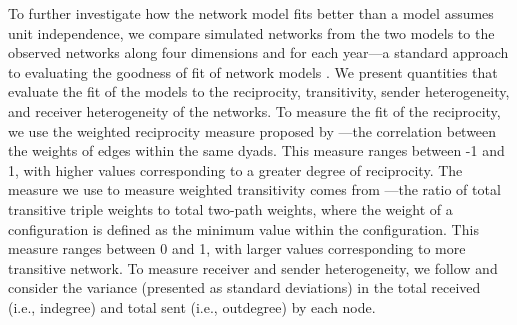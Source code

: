 \documentclass[reqno,onecolumn,letterpaper,12pt]{article}
\begin{document}
To further investigate how the network model fits better than a model assumes unit independence, we compare simulated networks from the two models to the observed networks along four dimensions and for each year---a standard approach to evaluating the goodness of fit of network models \citep{hunter2008goodness}. We present quantities that evaluate the fit of the models to the reciprocity, transitivity, sender heterogeneity, and receiver heterogeneity of the networks. To measure the fit of the reciprocity, we use the weighted reciprocity measure proposed by \cite{garlaschelli2004patterns}---the correlation between the weights of edges within the same dyads. This measure ranges between -1 and 1, with higher values corresponding to a greater degree of reciprocity.  The measure we use to measure weighted transitivity comes from \cite{opsahl2009clustering}---the ratio of total transitive triple weights to total two-path weights, where the weight of a configuration is defined as the minimum value within the configuration. This measure ranges between 0 and 1, with larger values corresponding to more transitive network.  To measure receiver and sender heterogeneity, we follow \citet{minhas2019inferential} and consider the variance (presented as standard deviations) in the total received (i.e., indegree) and total sent (i.e., outdegree) by each node.
\end{document}

